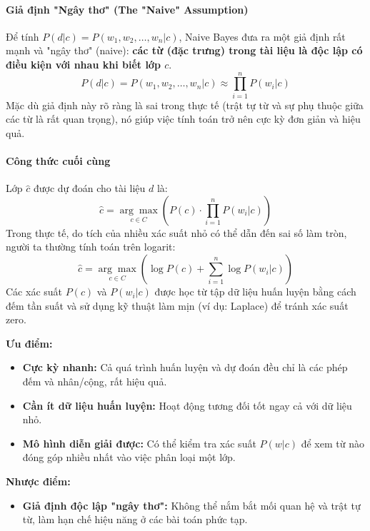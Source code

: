 \paragraph{Giả định "Ngây thơ" (The "Naive" Assumption)}
Để tính $P(d|c) = P(w_1, w_2, \dots, w_n | c)$, Naive Bayes đưa ra một giả định rất mạnh và "ngây thơ" (naive): \textbf{các từ (đặc trưng) trong tài liệu là độc lập có điều kiện với nhau khi biết lớp $c$}.
$$ P(d|c) = P(w_1, w_2, \dots, w_n | c) \approx \prod_{i=1}^{n} P(w_i | c) $$
Mặc dù giả định này rõ ràng là sai trong thực tế (trật tự từ và sự phụ thuộc giữa các từ là rất quan trọng), nó giúp việc tính toán trở nên cực kỳ đơn giản và hiệu quả.

\paragraph{Công thức cuối cùng}
Lớp $\hat{c}$ được dự đoán cho tài liệu $d$ là:
\begin{equation}
    \hat{c} = \underset{c \in C}{\arg\max} \left( P(c) \cdot \prod_{i=1}^{n} P(w_i | c) \right)
    \label{eq:naive_bayes}
\end{equation}
Trong thực tế, do tích của nhiều xác suất nhỏ có thể dẫn đến sai số làm tròn, người ta thường tính toán trên logarit:
$$ \hat{c} = \underset{c \in C}{\arg\max} \left( \log P(c) + \sum_{i=1}^{n} \log P(w_i | c) \right) $$
Các xác suất $P(c)$ và $P(w_i|c)$ được học từ tập dữ liệu huấn luyện bằng cách đếm tần suất và sử dụng kỹ thuật làm mịn (ví dụ: Laplace) để tránh xác suất zero.

\begin{tcolorbox}[
    title=Đánh giá Naive Bayes,
    colback=blue!5!white, colframe=blue!50!black, fonttitle=\bfseries
]
\textbf{Ưu điểm:}
\begin{itemize}
    \item \textbf{Cực kỳ nhanh:} Cả quá trình huấn luyện và dự đoán đều chỉ là các phép đếm và nhân/cộng, rất hiệu quả.
    \item \textbf{Cần ít dữ liệu huấn luyện:} Hoạt động tương đối tốt ngay cả với dữ liệu nhỏ.
    \item \textbf{Mô hình diễn giải được:} Có thể kiểm tra xác suất $P(w|c)$ để xem từ nào đóng góp nhiều nhất vào việc phân loại một lớp.
\end{itemize}
\textbf{Nhược điểm:}
\begin{itemize}
    \item \textbf{Giả định độc lập "ngây thơ":} Không thể nắm bắt mối quan hệ và trật tự từ, làm hạn chế hiệu năng ở các bài toán phức tạp.
\end{itemize}
\end{tcolorbox}


